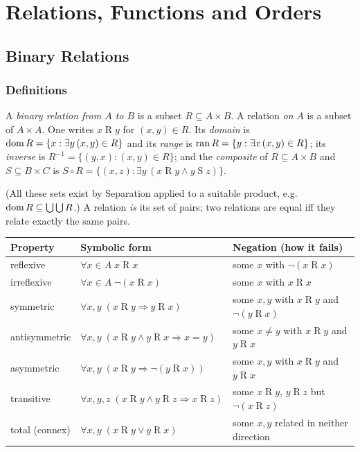 \part{Relations, Functions and Orders}

\chapter{Binary Relations}\label{ch:relations}

\section{Definitions}

\begin{definition}[Relation]
	A \emph{binary relation from $A$ to $B$} is a subset $R\subseteq A\times B$. A relation \emph{on} $A$ is a subset of $A\times A$. One writes $x\mathrel Ry$ for $(x,y)\in R$. Its \emph{domain} is $\operatorname{dom} R=\{x:\exists y\,(x,y)\in R\}$ and its \emph{range} is $\operatorname{ran} R=\{y:\exists x\,(x,y)\in R\}$; its \emph{inverse} is $R^{-1}=\{(y,x):(x,y)\in R\}$; and the \emph{composite} of $R\subseteq A\times B$ and $S\subseteq B\times C$ is $S\circ R=\{(x,z):\exists y\,(x\mathrel Ry\wedge y\mathrel Sz)\}$.
\end{definition}
(All these sets exist by Separation applied to a suitable product, e.g.\ $\operatorname{dom} R\subseteq\bigcup\bigcup R$.) A relation \emph{is} its set of pairs; two relations are equal iff they relate exactly the same pairs.

\begin{definition}\label{def:relprops}
	\begin{center}
		\begin{tabular}{@{}lp{4.4cm}p{7.6cm}@{}}
			\toprule
			\textbf{Property} & \textbf{Symbolic form} & \textbf{Negation (how it fails)}\\
			\midrule
			reflexive & $\forall x\in A\;x\mathrel Rx$ & some $x$ with $\neg(x\mathrel Rx)$\\
			irreflexive & $\forall x\in A\;\neg(x\mathrel Rx)$ & some $x$ with $x\mathrel Rx$\\
			symmetric & $\forall x,y\;(x\mathrel Ry\Rightarrow y\mathrel Rx)$ & some $x,y$ with $x\mathrel Ry$ and $\neg(y\mathrel Rx)$\\
			antisymmetric & $\forall x,y\;(x\mathrel Ry\wedge y\mathrel Rx\Rightarrow x=y)$ & some $x\ne y$ with $x\mathrel Ry$ and $y\mathrel Rx$\\
			asymmetric & $\forall x,y\;(x\mathrel Ry\Rightarrow\neg(y\mathrel Rx))$ & some $x,y$ with $x\mathrel Ry$ and $y\mathrel Rx$\\
			transitive & $\forall x,y,z\;(x\mathrel Ry\wedge y\mathrel Rz\Rightarrow x\mathrel Rz)$ & some $x\mathrel Ry$, $y\mathrel Rz$ but $\neg(x\mathrel Rz)$\\
			total (connex) & $\forall x,y\;(x\mathrel Ry\vee y\mathrel Rx)$ & some $x,y$ related in neither direction\\
			\bottomrule
		\end{tabular}
	\end{center}
\end{definition}

